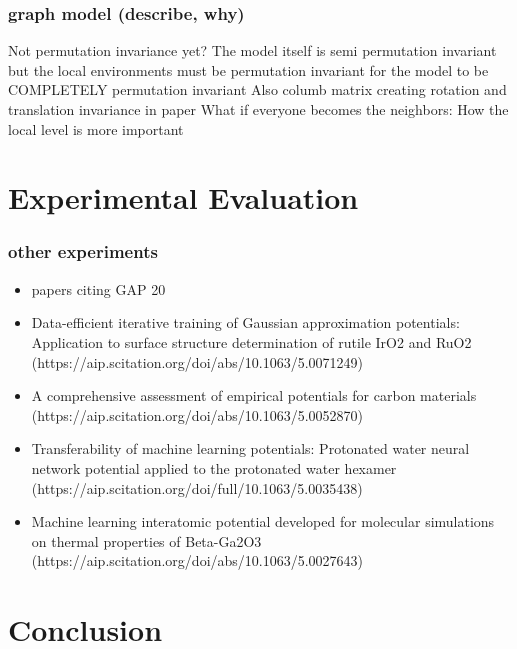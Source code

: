 \documentclass[12pt]{scrartcl}
\begin{document}
\subsubsection{graph model (describe, why)}  
Not permutation invariance yet?
\newline The model itself is semi permutation invariant but the local environments must be permutation invariant for the model to be COMPLETELY permutation invariant
\newline Also columb matrix creating rotation and translation invariance in paper
\newline What if everyone becomes the neighbors: How the local level is more important
 


\newpage

\section{Experimental Evaluation}
\subsubsection{other experiments}  
\begin{itemize}
    \item papers citing GAP 20
    \item Data-efficient iterative training of Gaussian approximation potentials: Application to surface structure determination of rutile IrO2 and RuO2 (https://aip.scitation.org/doi/abs/10.1063/5.0071249)
    \item A comprehensive assessment of empirical potentials for carbon materials (https://aip.scitation.org/doi/abs/10.1063/5.0052870)
    \item Transferability of machine learning potentials: Protonated water neural network potential applied to the protonated water hexamer (https://aip.scitation.org/doi/full/10.1063/5.0035438)
    \item Machine learning interatomic potential developed for molecular simulations on thermal properties of Beta-Ga2O3 (https://aip.scitation.org/doi/abs/10.1063/5.0027643)
\end{itemize}
\newpage

\section{Conclusion}

\newpage



\end{document}
